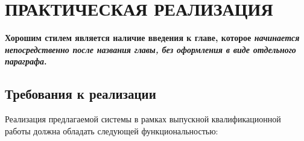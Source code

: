 

\chapter{ПРАКТИЧЕСКАЯ РЕАЛИЗАЦИЯ} \label{ch:ch2}

\textbf{Хорошим стилем является наличие введения к главе, которое \textit{начинается непосредственно после названия главы, без оформления в виде отдельного параграфа}.}


\section{Требования к реализации} \label{sec:requirements} %

Реализация предлагаемой системы в рамках выпускной квалификационной работы должна обладать следующей функциональностью:

